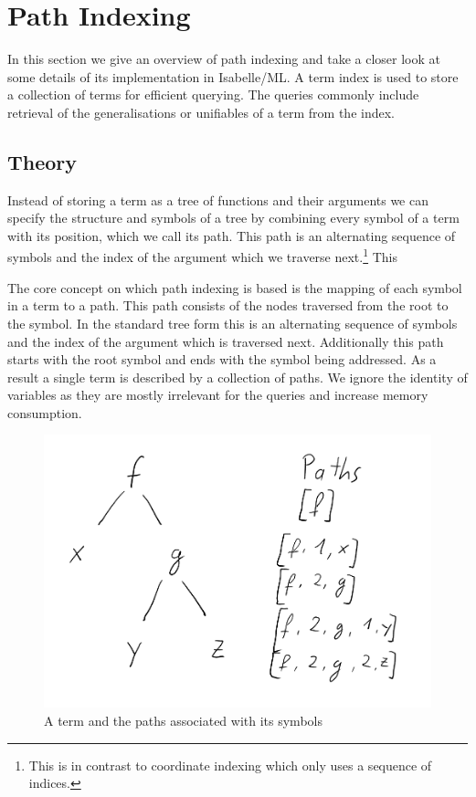 \chapter{Path Indexing}
In this section we give an overview of path indexing and take a closer look at some details of its implementation in Isabelle/ML.
A term index is used to store a collection of terms for efficient querying. The queries commonly include retrieval of the generalisations or unifiables of a term from the index.

\section{Theory}
Instead of storing a term as a tree of functions and their arguments we can specify the structure and symbols of a tree by combining every symbol of a term with its position, which we call its path. This path is an alternating sequence of symbols and the index of the argument which we traverse next.\footnote{This is in contrast to coordinate indexing which only uses a sequence of indices.} This

The core concept on which path indexing is based is the mapping of each symbol in a term to a path. This path consists of the nodes traversed from the root to the symbol. In the standard tree form this is an alternating sequence of symbols and the index of the argument which is traversed next. Additionally this path starts with the root symbol and ends with the symbol being addressed. As a result a single term is described by a collection of paths. We ignore the identity of variables as they are mostly irrelevant for the queries and increase memory consumption.

\begin{figure}[h]
\centering
\includegraphics[scale=0.25]{figures/term_path.png}
\caption{A term and the paths associated with its symbols}
\end{figure}

